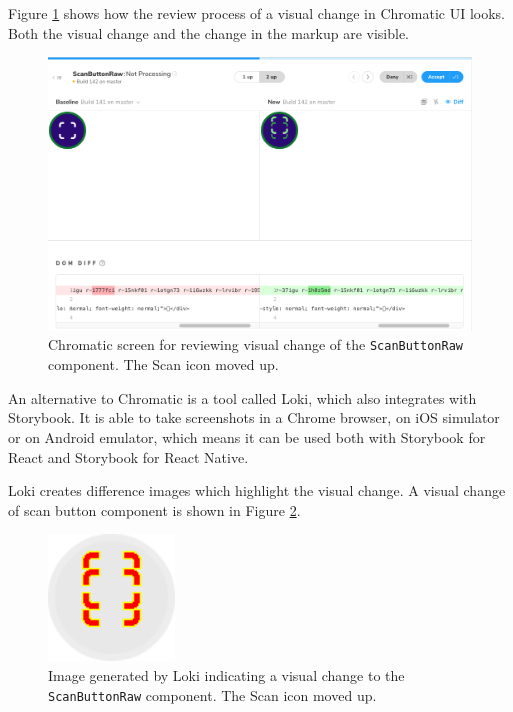 \documentclass[
  digital, %
  table,   %
  oneside, %
  lof,     %
  lot,     %
]{fithesis3}
\begin{document}
Figure \ref{fig:chromatic_diff} shows how the review process of a visual change in Chromatic UI looks. Both the visual change and the change in the markup are visible.

\begin{figure}
    \begin{center}
        \includegraphics[width=\textwidth]{figures/other/chromatic_diff}
    \end{center}
    \caption{Chromatic screen for reviewing visual change of the \texttt{ScanButtonRaw} component. The Scan icon moved up.}
    \label{fig:chromatic_diff}
\end{figure}

An alternative to Chromatic is a tool called Loki, which also integrates with Storybook. It is able to take screenshots in a Chrome browser, on iOS simulator or on Android emulator, which means it can be used both with Storybook for React and Storybook for React Native.

Loki creates difference images which highlight the visual change. A visual change of scan button component is shown in Figure \ref{fig:loki_diff}.

\begin{figure}
    \begin{center}
        \includegraphics[width=0.3\textwidth]{figures/other/loki_diff}
    \end{center}
    \caption{Image generated by Loki indicating a visual change to the \texttt{ScanButtonRaw} component. The Scan icon moved up.}
    \label{fig:loki_diff}
\end{figure}
\end{document}
